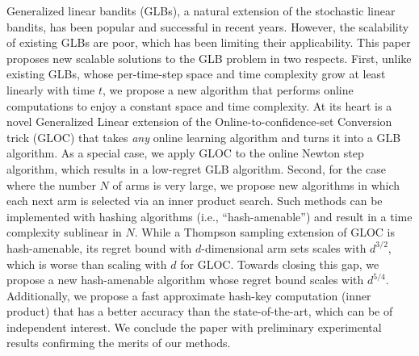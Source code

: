   Generalized linear bandits (GLBs), a natural extension of the stochastic linear bandits, has been popular and successful in recent years.  However, the scalability of existing GLBs are poor, which has been limiting their applicability.  This paper proposes new scalable solutions to the GLB problem in two respects.  First, unlike existing GLBs, whose per-time-step space and time complexity grow at least linearly with time $t$, we propose a new algorithm that performs online computations to enjoy a constant space and time complexity.  At its heart is a novel Generalized Linear extension of the Online-to-confidence-set Conversion trick (GLOC) that takes \emph{any} online learning algorithm and turns it into a GLB algorithm.  As a special case, we apply GLOC to the online Newton step algorithm, which results in a low-regret GLB algorithm.  Second, for the case where the number $N$ of arms is very large, we propose new algorithms in which each next arm is selected via an inner product search.  Such methods can be implemented with hashing algorithms (i.e., ``hash-amenable'') and result in a time complexity sublinear in $N$.  While a Thompson sampling extension of GLOC is hash-amenable, its regret bound with $d$-dimensional arm sets scales with $d^{3/2}$, which is worse than scaling with $d$ for GLOC.  Towards closing this gap, we propose a new hash-amenable algorithm whose regret bound scales with $d^{5/4}$.  Additionally, we propose a fast approximate hash-key computation (inner product) that has a better accuracy than the state-of-the-art, which can be of independent interest.  We conclude the paper with preliminary experimental results confirming the merits of our methods.  
